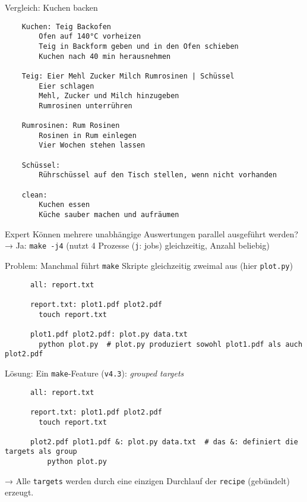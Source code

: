 
\begin{frame}[fragile]{Vergleich: Kuchen backen}
  \begin{center}
    \begin{verbatim}
    Kuchen: Teig Backofen
        Ofen auf 140°C vorheizen
        Teig in Backform geben und in den Ofen schieben
        Kuchen nach 40 min herausnehmen

    Teig: Eier Mehl Zucker Milch Rumrosinen | Schüssel
        Eier schlagen
        Mehl, Zucker und Milch hinzugeben
        Rumrosinen unterrühren

    Rumrosinen: Rum Rosinen
        Rosinen in Rum einlegen
        Vier Wochen stehen lassen

    Schüssel:
        Rührschüssel auf den Tisch stellen, wenn nicht vorhanden

    clean:
        Kuchen essen
        Küche sauber machen und aufräumen
    \end{verbatim}
  \end{center}
\end{frame}

\begin{frame}[fragile]{Expert}
  Können mehrere unabhängige Auswertungen parallel ausgeführt werden? \\
  → Ja: \;\texttt{make -j4}\; (nutzt 4 Prozesse (\texttt{j}: jobs) gleichzeitig, Anzahl beliebig)

  Problem: Manchmal führt \texttt{make} Skripte gleichzeitig zweimal aus (hier \texttt{plot.py})
  \begin{center}
    \small
    \begin{verbatim}
      all: report.txt

      report.txt: plot1.pdf plot2.pdf
        touch report.txt

      plot1.pdf plot2.pdf: plot.py data.txt
        python plot.py  # plot.py produziert sowohl plot1.pdf als auch plot2.pdf
    \end{verbatim}
  \end{center}

  Lösung: Ein \texttt{make}-Feature (\texttt{v4.3}): \emph{grouped targets}
  \begin{center}
    \small
    \begin{verbatim}
      all: report.txt

      report.txt: plot1.pdf plot2.pdf
        touch report.txt

      plot2.pdf plot1.pdf &: plot.py data.txt  # das &: definiert die targets als group 
          python plot.py

    \end{verbatim}
  \end{center}
   → Alle \texttt{targets} werden durch eine einzigen Durchlauf der \texttt{recipe} (gebündelt) erzeugt.
\end{frame}

